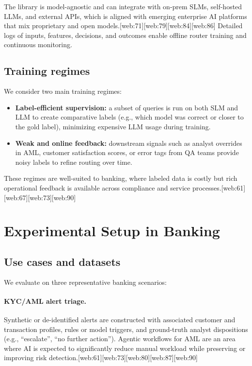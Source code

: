 \documentclass[11pt]{article}
\begin{document}
The library is model-agnostic and can integrate with on-prem SLMs, self-hosted LLMs, and external APIs, which is aligned with emerging enterprise AI platforms that mix proprietary and open models.[web:71][web:79][web:84][web:86] Detailed logs of inputs, features, decisions, and outcomes enable offline router training and continuous monitoring.

\subsection{Training regimes}

We consider two main training regimes:
\begin{itemize}
    \item \textbf{Label-efficient supervision:} a subset of queries is run on both SLM and LLM to create comparative labels (e.g., which model was correct or closer to the gold label), minimizing expensive LLM usage during training.
    \item \textbf{Weak and online feedback:} downstream signals such as analyst overrides in AML, customer satisfaction scores, or error tags from QA teams provide noisy labels to refine routing over time.
\end{itemize}

These regimes are well-suited to banking, where labeled data is costly but rich operational feedback is available across compliance and service processes.[web:61][web:67][web:73][web:90]

\section{Experimental Setup in Banking}

\subsection{Use cases and datasets}

We evaluate on three representative banking scenarios:

\paragraph{KYC/AML alert triage.} Synthetic or de-identified alerts are constructed with associated customer and transaction profiles, rules or model triggers, and ground-truth analyst dispositions (e.g., ``escalate'', ``no further action''). Agentic workflows for AML are an area where AI is expected to significantly reduce manual workload while preserving or improving risk detection.[web:61][web:73][web:80][web:87][web:90]
\end{document}
